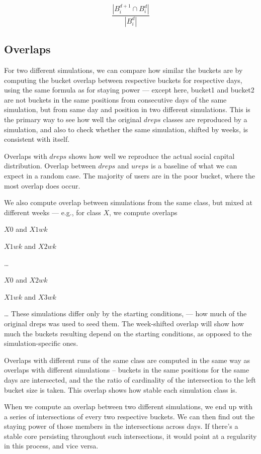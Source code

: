 \documentclass[10pt,oneside]{memoir}
\begin{document}
\[ \frac{|B_i^{d+1} \cap B_i^d|}{|B_i^d|} \]



\subsection{Overlaps}
\label{overlaps}

For two different simulations, we can compare how similar the buckets are by computing the bucket overlap between respective buckets for respective days, using the same formula as for staying power --- except here, bucket1 and bucket2 are not buckets in the same positions from consecutive days of the same simulation,  but from same day and position in two different simulations.  This is the primary way to see how well the original $dreps$ classes are reproduced by a simulation, and also to check whether the same simulation, shifted by weeks, is consistent with itself.


Overlaps with $dreps$ shows how well we reproduce the actual social capital distribution.  Overlap between $dreps$ and $ureps$ is a baseline of what we can expect in a random case.  The majority of users are in the poor bucket, where the most overlap does occur.


We also compute overlap between simulations from the same class, but mixed at different weeks --- e.g., for class $X$, we compute overlaps


$X0$ and $X1wk$


$X1wk$ and $X2wk$


{\ldots}


$X0$ and $X2wk$


$X1wk$ and $X3wk$


{\ldots}
These simulations differ only by the starting conditions, --- how much of the original dreps was used to seed them.  The week-shifted overlap will show how much the buckets resulting depend on the starting conditions, as opposed to the simulation-specific ones.


Overlaps with different runs of the same class are computed in the same way as overlaps with different simulations -- buckets in the same positions for the same days are intersected, and the the ratio of cardinality of the intersection to the left bucket size is taken.  This overlap shows how stable each simulation class is.


When we compute an overlap between two different simulations, we end up with a series of intersections of every two respective buckets.  We can then find out the staying power of those members in the intersections across days.  If there's a stable core persisting throughout such intersections, it would point at a regularity in this process, and vice versa.
\end{document}
